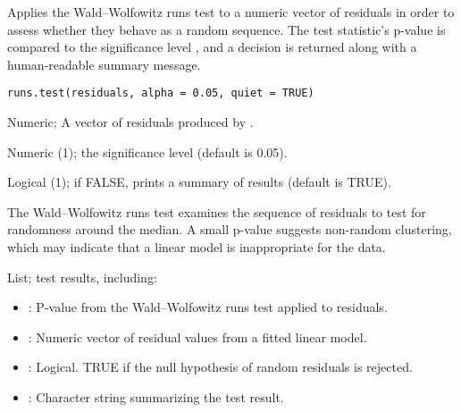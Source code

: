 \documentclass[a4paper]{book}
\begin{document}
%
\begin{Description}
Applies the Wald–Wolfowitz runs test to a numeric vector of residuals in
order to assess whether they behave as a random sequence. The test statistic’s
p-value is compared to the significance level , and a decision is
returned along with a human-readable summary message.
\end{Description}
%
\begin{Usage}
\begin{verbatim}
runs.test(residuals, alpha = 0.05, quiet = TRUE)
\end{verbatim}
\end{Usage}
%
\begin{Arguments}
\begin{ldescription}
\item[\code{residuals}] Numeric; A vector of residuals produced by .

\item[\code{alpha}] Numeric (1); the significance level (default is 0.05).

\item[\code{quiet}] Logical (1); if FALSE, prints a summary of results (default is TRUE).
\end{ldescription}
\end{Arguments}
%
\begin{Details}
The Wald–Wolfowitz runs test examines the sequence of residuals to test for
randomness around the median. A small p-value suggests non-random clustering,
which may indicate that a linear model is inappropriate for the data.
\end{Details}
%
\begin{Value}
List; test results, including:
\begin{itemize}

\item{} : P-value from the Wald–Wolfowitz runs test applied to residuals.
\item{} : Numeric vector of residual values from a fitted linear model.
\item{} : Logical. TRUE if the null hypothesis of random residuals is rejected.
\item{} : Character string summarizing the test result.

\end{itemize}

\end{Value}
\end{document}
